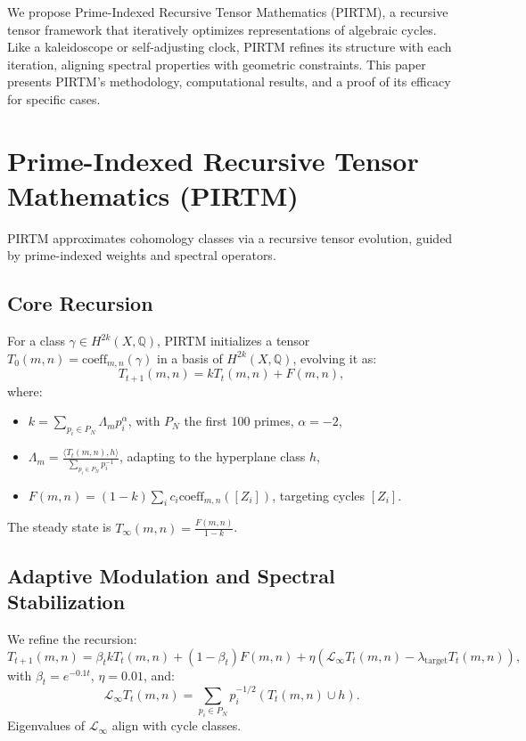 \documentclass[11pt]{article}
\theoremstyle{plain}
\begin{document}
We propose Prime-Indexed Recursive Tensor Mathematics (PIRTM), a recursive tensor framework that iteratively optimizes representations of algebraic cycles. Like a kaleidoscope or self-adjusting clock, PIRTM refines its structure with each iteration, aligning spectral properties with geometric constraints. This paper presents PIRTM’s methodology, computational results, and a proof of its efficacy for specific cases.

\section{Prime-Indexed Recursive Tensor Mathematics (PIRTM)}

PIRTM approximates cohomology classes via a recursive tensor evolution, guided by prime-indexed weights and spectral operators.

\subsection{Core Recursion}
For a class \(\gamma \in H^{2k}(X, \mathbb{Q})\), PIRTM initializes a tensor \(T_0(m,n) = \text{coeff}_{m,n}(\gamma)\) in a basis of \(H^{2k}(X, \mathbb{Q})\), evolving it as:
\begin{equation}
T_{t+1}(m,n) = k T_t(m,n) + F(m,n),
\end{equation}
where:
\begin{itemize}
    \item \(k = \sum_{p_i \in P_N} \Lambda_m p_i^\alpha\), with \(P_N\) the first 100 primes, \(\alpha = -2\),
    \item \(\Lambda_m = \frac{\langle T_t(m,n), h \rangle}{\sum_{p_i \in P_N} p_i^{-1}}\), adapting to the hyperplane class \(h\),
    \item \(F(m,n) = (1-k) \sum_i c_i \text{coeff}_{m,n}([Z_i])\), targeting cycles \([Z_i]\).
\end{itemize}
The steady state is \(T_\infty(m,n) = \frac{F(m,n)}{1-k}\).

\subsection{Adaptive Modulation and Spectral Stabilization}
We refine the recursion:
\begin{equation}
T_{t+1}(m,n) = \beta_t k T_t(m,n) + (1-\beta_t) F(m,n) + \eta (\mathcal{L}_\infty T_t(m,n) - \lambda_{\text{target}} T_t(m,n)),
\end{equation}
with \(\beta_t = e^{-0.1 t}\), \(\eta = 0.01\), and:
\begin{equation}
\mathcal{L}_\infty T_t(m,n) = \sum_{p_i \in P_N} p_i^{-1/2} (T_t(m,n) \cup h).
\end{equation}
Eigenvalues of \(\mathcal{L}_\infty\) align with cycle classes.
\end{document}
